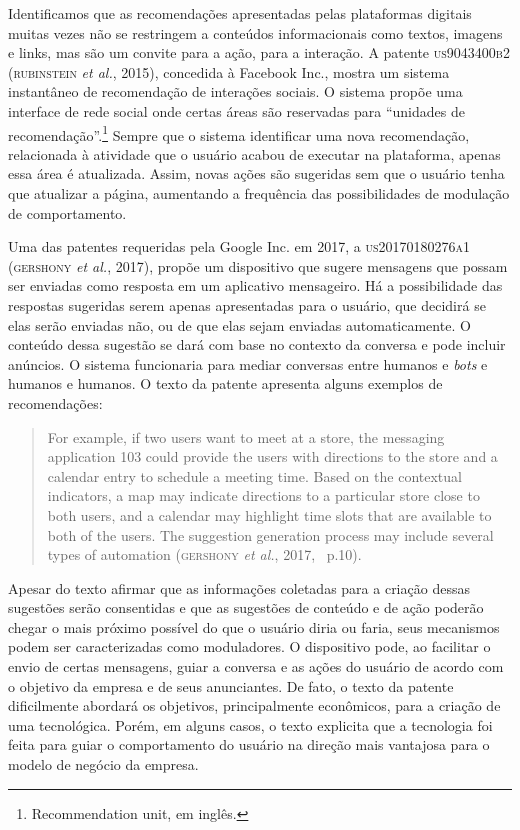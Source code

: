 Identificamos que as recomendações apresentadas pelas plataformas
digitais muitas vezes não se restringem a conteúdos informacionais como
textos, imagens e links, mas são um convite para a ação, para a
interação. A patente \textsc{us9043400b2} (\textsc{rubinstein} \emph{et al.}, 2015),
concedida à Facebook Inc., mostra um sistema instantâneo de recomendação
de interações sociais. O sistema propõe uma interface de rede social
onde certas áreas são reservadas para ``unidades de
recomendação''.\footnote{Recommendation unit, em inglês.} Sempre que o
sistema identificar uma nova recomendação, relacionada à atividade que o
usuário acabou de executar na plataforma, apenas essa área é atualizada.
Assim, novas ações são sugeridas sem que o usuário tenha que atualizar a
página, aumentando a frequência das possibilidades de modulação de
comportamento.

Uma das patentes requeridas pela Google Inc. em 2017, a \textsc{us20170180276a1}
(\textsc{gershony} \emph{et al.}, 2017), propõe um dispositivo que sugere
mensagens que possam ser enviadas como resposta em um aplicativo
mensageiro. Há a possibilidade das respostas sugeridas serem apenas
apresentadas para o usuário, que decidirá se elas serão enviadas não, ou
de que elas sejam enviadas automaticamente. O conteúdo dessa sugestão se
dará com base no contexto da conversa e pode incluir anúncios. O sistema
funcionaria para mediar conversas entre humanos e \emph{bots} e humanos
e humanos. O texto da patente apresenta alguns exemplos de
recomendações:

\begin{quote}
For example, if two users want to meet at a store, the messaging
application 103 could provide the users with directions to the store and
a calendar entry to schedule a meeting time. Based on the contextual
indicators, a map may indicate directions to a particular store close to
both users, and a calendar may highlight time slots that are available
to both of the users. The suggestion generation process may include
several types of automation (\textsc{gershony} \emph{et al.}, 2017,~ p.10).
\end{quote}

Apesar do texto afirmar que as informações coletadas para a criação
dessas sugestões serão consentidas e que as sugestões de conteúdo e de
ação poderão chegar o mais próximo possível do que o usuário diria ou
faria, seus mecanismos podem ser caracterizadas como moduladores. O
dispositivo pode, ao facilitar o envio de certas mensagens, guiar a
conversa e as ações do usuário de acordo com o objetivo da empresa e de
seus anunciantes. De fato, o texto da patente dificilmente abordará os
objetivos, principalmente econômicos, para a criação de uma tecnológica.
Porém, em alguns casos, o texto explicita que a tecnologia foi feita
para guiar o comportamento do usuário na direção mais vantajosa para o
modelo de negócio da empresa.

